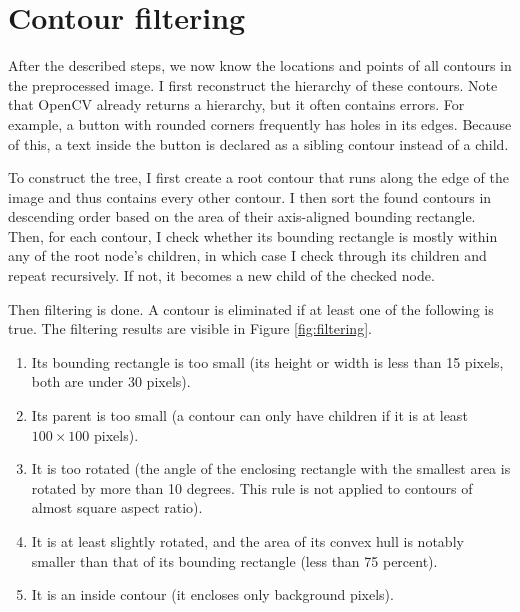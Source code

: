 \documentclass[
  digital,     %
  oneside,     %
  nosansbold,  %
  nocolorbold, %
  lof,         %
  lot,         %
]{fithesis4}
\begin{document}
\section{Contour filtering}

After the described steps, we now know the locations and points of all contours in the preprocessed image. I first reconstruct the hierarchy of these contours. Note that OpenCV already returns a hierarchy, but it often contains errors. For example, a button with rounded corners frequently has holes in its edges. Because of this, a text inside the button is declared as a sibling contour instead of a child.

To construct the tree, I first create a root contour that runs along the edge of the image and thus contains every other contour. I then sort the found contours in descending order based on the area of their axis-aligned bounding rectangle. Then, for each contour, I check whether its bounding rectangle is mostly within any of the root node's children, in which case I check through its children and repeat recursively. If not, it becomes a new child of the checked node.

Then filtering is done. A contour is eliminated if at least one of the following is true. The filtering results are visible in Figure \ref{fig:filtering}.

\begin{enumerate}
    \item Its bounding rectangle is too small (its height or width is less than 15 pixels, both are under 30 pixels).
    \item Its parent is too small (a contour can only have children if it is at least $100 \times 100$ pixels).
    \item It is too rotated (the angle of the enclosing rectangle with the smallest area is rotated by more than 10 degrees. This rule is not applied to contours of almost square aspect ratio).
    \item It is at least slightly rotated, and the area of its convex hull is notably smaller than that of its bounding rectangle (less than 75 percent).
    \item It is an inside contour (it encloses only background pixels).
\end{enumerate}
\end{document}
